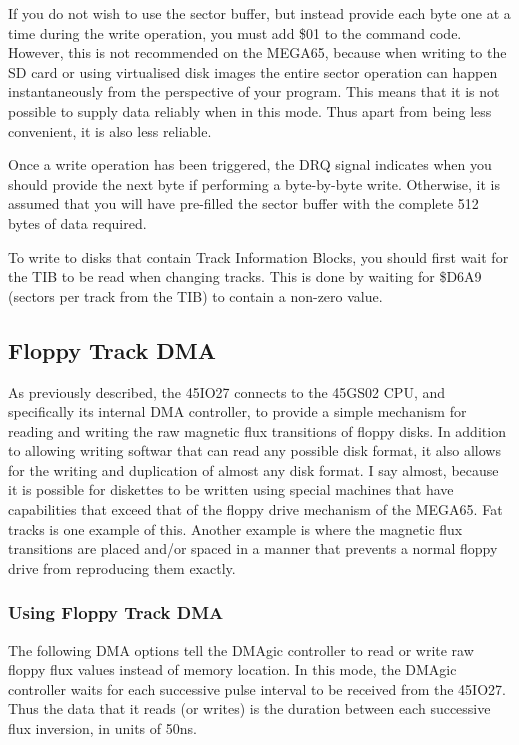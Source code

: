 If you do not wish
to use the sector buffer, but instead provide each byte one at a time
during the write operation, you must add \$01 to the command code.
However, this is not recommended on the MEGA65, because when writing
to the SD card or using virtualised disk images the entire sector
operation can happen instantaneously from the perspective of your
program.  This means that it is not possible to supply data reliably
when in this mode.  Thus apart from being less convenient, it is also
less reliable.

Once a write operation has been triggered, the DRQ signal indicates
when you should provide the next byte if performing a byte-by-byte
write. Otherwise, it is assumed that you will have pre-filled the
sector buffer with the complete 512 bytes of data required.

To write to disks that contain Track Information Blocks,
you should first wait for the TIB to be read when changing tracks. This is done by waiting
for \$D6A9 (sectors per track from the TIB) to contain a non-zero value.

\subsection{Floppy Track DMA}

As previously described, the 45IO27 connects to the 45GS02 CPU, and specifically its internal
DMA controller, to provide a simple mechanism for reading and writing the raw magnetic flux
transitions of floppy disks.  In addition to allowing writing softwar that can read any
possible disk format, it also allows for the writing and duplication of almost any disk format.
I say almost, because it is possible for diskettes to be written using special machines that
have capabilities that exceed that of the floppy drive mechanism of the MEGA65.  Fat tracks is
one example of this.  Another example is where the magnetic flux transitions are placed and/or
spaced in a manner that prevents a normal floppy drive from reproducing them exactly.

\subsubsection{Using Floppy Track DMA}

The following DMA options tell the DMAgic controller to read or write raw floppy flux values
instead of memory location. In this mode, the DMAgic controller waits for each successive
pulse interval to be received from the 45IO27.  Thus the data that it reads (or writes) is
the duration between each successive flux inversion, in units of 50ns.

